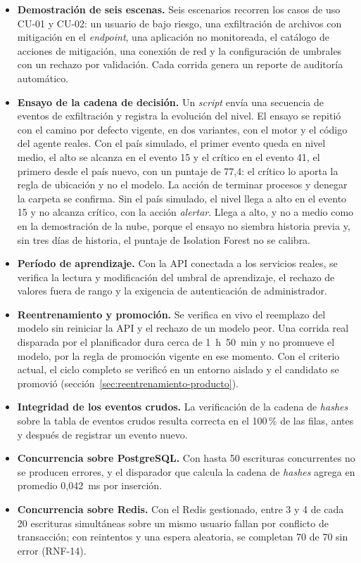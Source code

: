 \begin{itemize}
	\item \textbf{Demostración de seis escenas.} Seis escenarios recorren los casos de uso CU-01 y CU-02: un usuario de bajo riesgo, una exfiltración de archivos con mitigación en el \emph{endpoint}, una aplicación no monitoreada, el catálogo de acciones de mitigación, una conexión de red y la configuración de umbrales con un rechazo por validación. Cada corrida genera un reporte de auditoría automático.
	\item \textbf{Ensayo de la cadena de decisión.} Un \emph{script} envía una secuencia de eventos de exfiltración y registra la evolución del nivel. El ensayo se repitió con el camino por defecto vigente, en dos variantes, con el motor y el código del agente reales. Con el país simulado, el primer evento queda en nivel medio, el alto se alcanza en el evento 15 y el crítico en el evento 41, el primero desde el país nuevo, con un puntaje de 77,4: el crítico lo aporta la regla de ubicación y no el modelo. La acción de terminar procesos y denegar la carpeta se confirma. Sin el país simulado, el nivel llega a alto en el evento 15 y no alcanza crítico, con la acción \emph{alertar}. Llega a alto, y no a medio como en la demostración de la nube, porque el ensayo no siembra historia previa y, sin tres días de historia, el puntaje de Isolation Forest no se calibra.
	\item \textbf{Período de aprendizaje.} Con la API conectada a los servicios reales, se verifica la lectura y modificación del umbral de aprendizaje, el rechazo de valores fuera de rango y la exigencia de autenticación de administrador.
	\item \textbf{Reentrenamiento y promoción.} Se verifica en vivo el reemplazo del modelo sin reiniciar la API y el rechazo de un modelo peor. Una corrida real disparada por el planificador dura cerca de 1~h~50~min y no promueve el modelo, por la regla de promoción vigente en ese momento. Con el criterio actual, el ciclo completo se verificó en un entorno aislado y el candidato se promovió (sección~\ref{sec:reentrenamiento-producto}).
	\item \textbf{Integridad de los eventos crudos.} La verificación de la cadena de \emph{hashes} sobre la tabla de eventos crudos resulta correcta en el 100\,\% de las filas, antes y después de registrar un evento nuevo.
	\item \textbf{Concurrencia sobre PostgreSQL.} Con hasta 50 escrituras concurrentes no se producen errores, y el disparador que calcula la cadena de \emph{hashes} agrega en promedio 0,042~ms por inserción.
	\item \textbf{Concurrencia sobre Redis.} Con el Redis gestionado, entre 3 y 4 de cada 20 escrituras simultáneas sobre un mismo usuario fallan por conflicto de transacción; con reintentos y una espera aleatoria, se completan 70 de 70 sin error (RNF-14).
\end{itemize}

